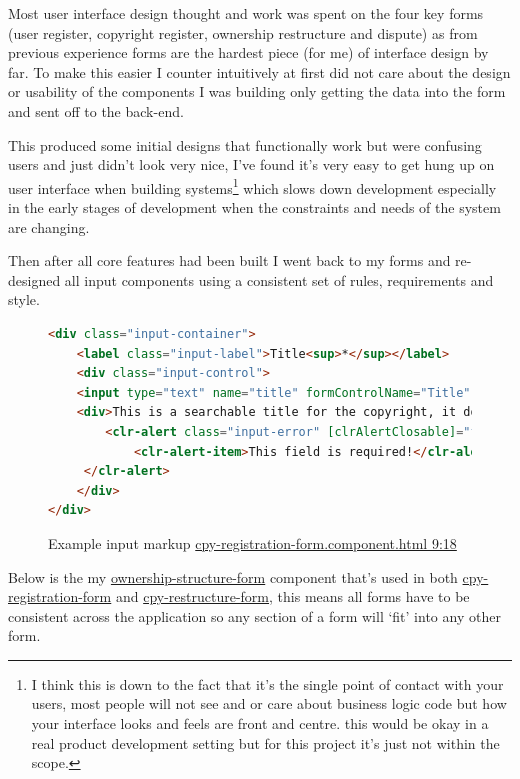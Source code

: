 Most user interface design thought and work was spent on the four key forms (user register, copyright register, ownership restructure and dispute) as from previous experience forms are the hardest piece (for me) of interface design by far. To make this easier I counter intuitively at first did not care about the design or usability of the components I was building only getting the data into the form and sent off to the back-end.

This produced some initial designs that functionally work but were confusing users and just didn't look very nice, I've found it's very easy to get hung up on user interface when building systems\footnote{I think this is down to the fact that it's the single point of contact with your users, most people will not see and or care about business logic code but how your interface looks and feels are front and centre. this would be okay in a real product development setting but for this project it's just not within the scope.} which slows down development especially in the early stages of development when the constraints and needs of the system are changing.

Then after all core features had been built I went back to my forms and re-designed all input components using a consistent set of rules, requirements and style.    

\begin{figure}[H]
\caption{Example input markup \href{https://github.com/MrHarrisonBarker/CRPL/blob/main/CRPL.Web/ClientApp/src/app/Forms/cpy-registration-form/cpy-registration-form.component.html}{cpy-registration-form.component.html 9:18}}
\centering
\begin{lstlisting}[language=html]
<div class="input-container">
	<label class="input-label">Title<sup>*</sup></label>
	<div class="input-control">
	<input type="text" name="title" formControlName="Title" placeholder="Hello world"/>
	<div>This is a searchable title for the copyright, it doesn't have to be unique only descriptive and relevant&nbsp;<sup>*saved to the blockchain</sup></div>
		<clr-alert class="input-error" [clrAlertClosable]="false" clrAlertType="danger" *ngIf="InvalidAndUntouched('Title')">
		 	<clr-alert-item>This field is required!</clr-alert-item>
	 </clr-alert>
	</div>
</div>
\end{lstlisting}
\end{figure}

Below is the my \href{https://github.com/MrHarrisonBarker/CRPL/tree/main/CRPL.Web/ClientApp/src/app/Forms/ownership-structure-form}{ownership-structure-form} component that's used in both \href{https://github.com/MrHarrisonBarker/CRPL/tree/main/CRPL.Web/ClientApp/src/app/Forms/cpy-registration-form}{cpy-registration-form} and \href{https://github.com/MrHarrisonBarker/CRPL/tree/main/CRPL.Web/ClientApp/src/app/Forms/cpy-restructure-form}{cpy-restructure-form}, this means all forms have to be consistent across the application so any section of a form will `fit' into any other form.

